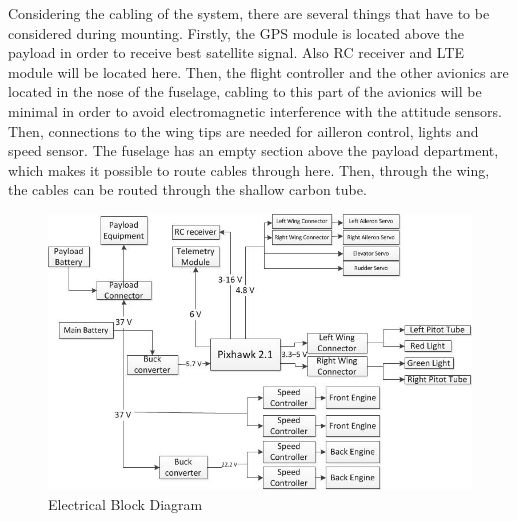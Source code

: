 Considering the cabling of the system, there are several things that have to be considered during mounting. Firstly, the GPS module is located above the payload in order to receive best satellite signal. Also RC receiver and LTE module will be located here. Then, the flight controller and the other avionics are located in the nose of the fuselage, cabling to this part of the avionics will be minimal in order to avoid electromagnetic interference with the attitude sensors. Then, connections to the wing tips are needed for ailleron control, lights and speed sensor. The fuselage has an empty section above the payload department, which makes it possible to route cables through here. Then, through the wing, the cables can be routed through the shallow carbon tube. 
\begin{figure}[htb]
    \centering
    \includegraphics[width=.7\textwidth]{./CommandDataHandling/Figures/elecdiag.jpg}
    \caption{Electrical Block Diagram}
    \label{fig:elec_diag}
\end{figure}


